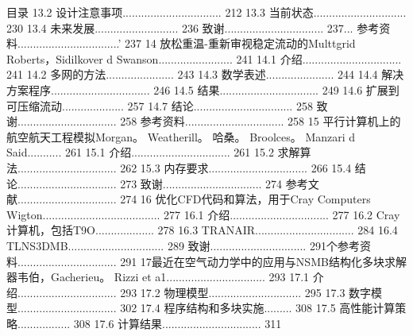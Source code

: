 \documentclass[UTF8,11pt,a4paper,openany,fontset=fandol]{ctexbook}
\begin{document}
目录 13.2 设计注意事项................................ 212 13.3 当前状态.............................. 230 13.4 未来发展........................... 236 致谢................................ 237... 参考资料.................................' 237 14 放松重温-重新审视稳定流动的Multtgrid Roberts，Sidilkover d Swanson........................ 241 14.1 介绍................................ 241 14.2 多网的方法...................... 243 14.3 数学表述...................... 244 14.4 解决方案程序................................ 246 14.5 结果................................ 249 14.6 扩展到可压缩流动.................... 257 14.7 结论................................ 258 致谢................................ 258 参考资料................................ 258 15 平行计算机上的航空航天工程模拟Morgan。 Weatherill。 哈桑。 Broolces。 Manzari d Said........... 261 15.1 介绍................................ 261 15.2 求解算法................................ 262 15.3 内存要求................................ 266 15.4 结论................................ 273 致谢................................ 274 参考文献................................ 274 16 优化CFD代码和算法，用于Cray Computers Wigton...................................... 277 16.1 介绍................................ 277 16.2 Cray计算机，包括T9O................... 278 16.3 TRANAIR................................ 284 16.4 TLNS3DMB............................... 289 致谢............................... 291个参考资料................................ 291 17最近在空气动力学中的应用与NSMB结构化多块求解器韦伯，Gacherieu。 Rizzi et a1................................ 293 17.1 介绍................................ 293 17.2 物理模型.............................. 295 17.3 数字模型................................ 302 17.4 程序结构和多块实施......... 308 17.5 高性能计算策略................. 308 17.6 计算结果................................ 311
\end{document}
